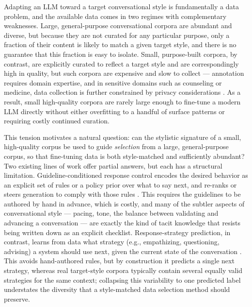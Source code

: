 \documentclass[manuscript,review,anonymous]{acmart}
\begin{document}
Adapting an LLM toward a target conversational style is fundamentally a data problem, and the available data comes in two regimes with complementary weaknesses. Large, general-purpose conversational corpora are abundant and diverse, but because they are not curated for any particular purpose, only a fraction of their content is likely to match a given target style, and there is no guarantee that this fraction is easy to isolate. Small, purpose-built corpora, by contrast, are explicitly curated to reflect a target style and are correspondingly high in quality, but such corpora are expensive and slow to collect --- annotation requires domain expertise, and in sensitive domains such as counseling or medicine, data collection is further constrained by privacy considerations \cite{zhou2023lima,zhang2025datasurvey}. As a result, small high-quality corpora are rarely large enough to fine-tune a modern LLM directly without either overfitting to a handful of surface patterns or requiring costly continued curation.

This tension motivates a natural question: can the stylistic signature of a small, high-quality corpus be used to guide \emph{selection} from a large, general-purpose corpus, so that fine-tuning data is both style-matched and sufficiently abundant? Two existing lines of work offer partial answers, but each has a structural limitation. Guideline-conditioned response control encodes the desired behavior as an explicit set of rules or a policy prior over what to say next, and re-ranks or steers generation to comply with those rules \cite{wen2025guidedtod}. This requires the guidelines to be authored by hand in advance, which is costly, and many of the subtler aspects of conversational style --- pacing, tone, the balance between validating and advancing a conversation --- are exactly the kind of tacit knowledge that resists being written down as an explicit checklist. Response-strategy prediction, in contrast, learns from data what strategy (e.g., empathizing, questioning, advising) a system should use next, given the current state of the conversation \cite{wan2025emodynamix}. This avoids hand-authored rules, but by construction it predicts a single next strategy, whereas real target-style corpora typically contain several equally valid strategies for the same context; collapsing this variability to one predicted label understates the diversity that a style-matched data selection method should preserve.
\end{document}
